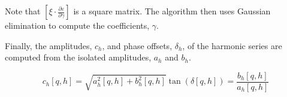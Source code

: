 \documentclass{article}
\begin{document}
\par{Note that $\left[\xi \cdot \frac{\partial \varepsilon}{\partial \gamma}\right]$ is a square matrix. The algorithm then uses Gaussian elimination to compute the coefficients, $\gamma$.}

\par{Finally, the amplitudes, $c_h$, and phase offsets, $\delta_h$, of the harmonic series are computed from the isolated amplitudes, $a_h$ and $b_h$.}

\begin{subequations}
\begin{equation}
c_h\left[q, h\right] = \sqrt{a_h^{2}\left[q, h\right] + b_h^{2}\left[q, h\right]}
\end{equation}
\begin{equation}
\tan\left(\delta\left[q, h\right]\right) = \frac{b_h\left[q, h\right]}{a_h\left[q, h\right]}
\end{equation}
\end{subequations}
\end{document}
